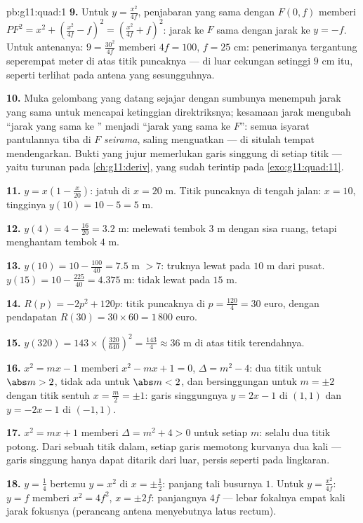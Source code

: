 \begin{solution}{pb:g11:quad:1}
\textbf{9.} Untuk $y = \frac{x^2}{4f}$, penjabaran yang sama dengan
$F(0, f)$ memberi $PF^2 = x^2 + \left(\frac{x^2}{4f} - f\right)^2
= \left(\frac{x^2}{4f} + f\right)^2$: jarak ke $F$ sama dengan
jarak ke $y = -f$. Untuk antenanya: $9 = \frac{30^2}{4f}$ memberi
$4f = 100$, $f = 25$ cm: penerimanya tergantung seperempat meter
di atas titik puncaknya --- di luar cekungan setinggi $9$ cm itu, seperti
terlihat pada antena yang sesungguhnya.

\textbf{10.} Muka gelombang yang datang sejajar dengan sumbunya
menempuh jarak yang sama untuk mencapai ketinggian direktriksnya;
kesamaan jarak mengubah ``jarak yang sama ke '' menjadi
``jarak yang sama ke $F$'': semua isyarat pantulannya tiba di
$F$ \emph{seirama}, saling menguatkan --- di situlah tempat mendengarkan.
Bukti yang jujur memerlukan  garis singgung di setiap titik ---
yaitu turunan pada \cref{ch:g11:deriv}, yang sudah terintip pada
\cref{exo:g11:quad:11}.

\textbf{11.} $y = x\left(1 - \frac{x}{20}\right)$: jatuh di
$x = 20$ m. Titik puncaknya di tengah jalan: $x = 10$, tingginya
$y(10) = 10 - 5 = 5$ m.

\textbf{12.} $y(4) = 4 - \frac{16}{20} = 3.2$ m: melewati tembok $3$ m
dengan sisa ruang, tetapi menghantam tembok $4$ m.

\textbf{13.} $y(10) = 10 - \frac{100}{40} = 7.5$ m $> 7$: truknya
lewat pada $10$ m dari pusat. $y(15) = 10 - \frac{225}{40}
= 4.375$ m: tidak lewat pada $15$ m.

\textbf{14.} $R(p) = -2p^2 + 120p$: titik puncaknya di
$p = \frac{120}{4} = 30$ euro, dengan pendapatan
$R(30) = 30 \times 60 = 1\,800$ euro.

\textbf{15.} $y(320) = 143 \times \left(\frac{320}{640}\right)^2
= \frac{143}{4} \approx 36$ m di atas titik terendahnya.

\textbf{16.} $x^2 = mx - 1$ memberi $x^2 - mx + 1 = 0$,
$\Delta = m^2 - 4$: dua titik untuk $\abs m > 2$, tidak ada untuk
$\abs m < 2$, dan bersinggungan untuk $m = \pm 2$ dengan titik sentuh
$x = \frac m2 = \pm 1$: garis singgungnya $y = 2x - 1$ di $(1, 1)$ dan
$y = -2x - 1$ di $(-1, 1)$.

\textbf{17.} $x^2 = mx + 1$ memberi $\Delta = m^2 + 4 > 0$ untuk
setiap $m$: selalu dua titik potong. Dari sebuah titik dalam,
setiap garis memotong kurvanya dua kali --- garis singgung hanya dapat
ditarik dari luar, persis seperti pada lingkaran.

\textbf{18.} $y = \frac14$ bertemu $y = x^2$ di $x = \pm\frac12$:
panjang tali busurnya $1$. Untuk $y = \frac{x^2}{4f}$: $y = f$ memberi
$x^2 = 4f^2$, $x = \pm 2f$: panjangnya $4f$ --- lebar fokalnya
empat kali jarak fokusnya (perancang antena menyebutnya
latus rectum).


\end{solution}
